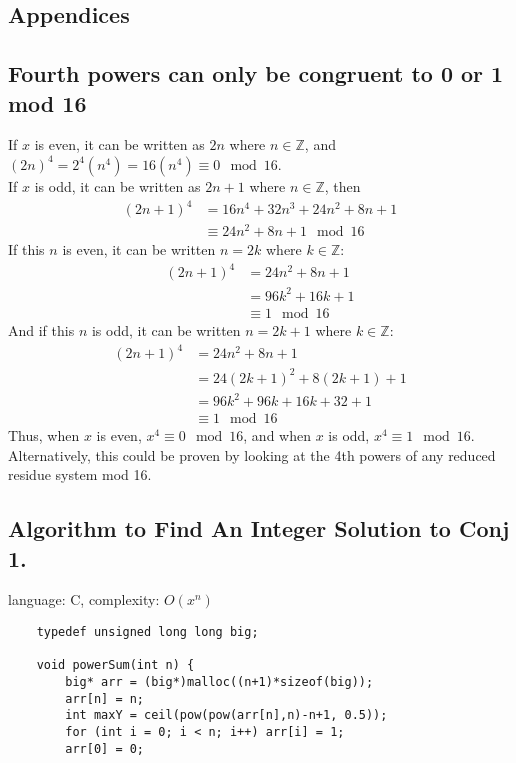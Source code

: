 \documentclass{article}
\begin{document}
\begin{flushleft}
\newpage

\section{Appendices}
\subsection{Fourth powers can only be congruent to 0 or 1 mod 16}
If $x$ is even, it can be written as $2n$ where $n \in \mathbb{Z}$, and $(2n)^4=2^4(n^4)=16(n^4) \equiv 0 \mod 16$. \\
If $x$ is odd, it can be written as $2n+1$ where $n \in \mathbb{Z}$, then 
\begin{align*}
    (2n+1)^4 &= 16n^4 + 32n^3 + 24n^2 + 8n + 1 \\
    &\equiv 24n^2+8n+1 \mod 16
\end{align*}
If this $n$ is even, it can be written $n=2k$ where $k \in \mathbb{Z}$:
\begin{align*}
    (2n+1)^4 &= 24n^2+8n+1 \\
    &= 96k^2 + 16k + 1 \\
    &\equiv 1 \mod 16
\end{align*}
And if this $n$ is odd, it can be written  $n=2k+1$ where $k \in \mathbb{Z}$: 
\begin{align*}
    (2n+1)^4 &= 24n^2 + 8n + 1 \\
    &= 24(2k+1)^2 + 8(2k+1) + 1 \\
    &= 96k^2 + 96k + 16k + 32 + 1\\
    &\equiv 1 \mod 16
\end{align*}
Thus, when $x$ is even, $x^4 \equiv 0 \mod 16$, and when $x$ is odd, $x^4 \equiv 1 \mod 16$. \\
Alternatively, this could be proven by looking at the 4th powers of any reduced residue system mod 16. 

\subsection{Algorithm to Find An Integer Solution to Conj 1.}
language: C, complexity: $O(x^n)$
\begin{lstlisting}
    typedef unsigned long long big;

    void powerSum(int n) {
        big* arr = (big*)malloc((n+1)*sizeof(big));
        arr[n] = n;
        int maxY = ceil(pow(pow(arr[n],n)-n+1, 0.5));
        for (int i = 0; i < n; i++) arr[i] = 1;
        arr[0] = 0;


\end{lstlisting}
\end{flushleft}
\end{document}
